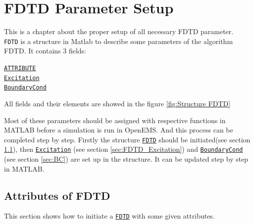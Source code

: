 \chapter{FDTD Parameter Setup}\label{chap:FDTD Parameter Setup}
This is a chapter about the proper setup of all necessary FDTD parameter.\\
\texttt{FDTD}    is a structure in Matlab to describe some parameters of the algorithm FDTD. It contains 3 fields:  \label{para:FDTD} %
       \begin{myindentpar}
	      \hyperref[para:FDTD_ATTRIBUTE]{\texttt{ATTRIBUTE}} \\ 
	      \hyperref[para:Excitation]{\texttt{Excitation}}  \\ 
	      \hyperref[para:BoundaryCond]{\texttt{BoundaryCond}}
       \end{myindentpar}
All fields and  their elements  are showed in the figure \ref{fig:Structure FDTD}


  \def\svgwidth{0.8\textwidth}

Most of these parameters should be assigned with respective functions in MATLAB before a simulation is run in OpenEMS. And this process can be completed step by step. Firstly the structure \hyperref[para:FDTD]{\texttt{FDTD}} should be initiated(see section \ref{sec:FDTD_ATTRIBUTE}), then  \hyperref[para:Excitation]{\texttt{Excitation}} (see section \ref{sec:FDTD_Excitation}) and \hyperref[para:BoundaryCond]{\texttt{BoundaryCond}} (see section \ref{sec:BC}) are set up in the structure. It can be updated step by step in MATLAB.%

\section{Attributes of FDTD} \label{sec:FDTD_ATTRIBUTE}
 \label{para:FDTD_ATTRIBUTE}
This section shows how to initiate a \hyperref[para:FDTD]{\texttt{FDTD}} with some given attributes. 

